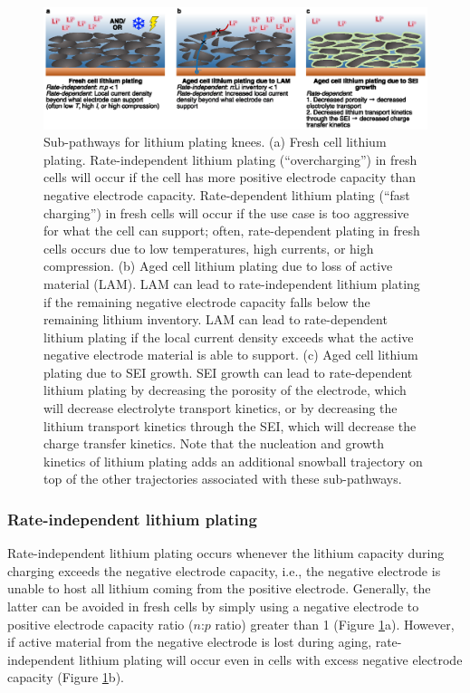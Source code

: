 \documentclass[journal=jpclcd,manuscript=article]{achemso}
\begin{document}
\begin{figure}[tbph]
    \centering
    \includegraphics[scale=0.9]{figures/plating_pathways.eps}
    \caption{Sub-pathways for lithium plating knees.
    (a) Fresh cell lithium plating. Rate-independent lithium plating (``overcharging'') in fresh cells will occur if the cell has more positive electrode capacity than negative electrode capacity.
    Rate-dependent lithium plating (``fast charging'') in fresh cells will occur if the use case is too aggressive for what the cell can support; often, rate-dependent plating in fresh cells occurs due to low temperatures, high currents, or high compression.
    (b) Aged cell lithium plating due to loss of active material (LAM). LAM can lead to rate-independent lithium plating if the remaining negative electrode capacity falls below the remaining lithium inventory. LAM can lead to rate-dependent lithium plating if the local current density exceeds what the active negative electrode material is able to support.
    (c) Aged cell lithium plating due to SEI growth. SEI growth can lead to rate-dependent lithium plating by decreasing the porosity of the electrode, which will decrease electrolyte transport kinetics, or by decreasing the lithium transport kinetics through the SEI, which will decrease the charge transfer kinetics.
    Note that the nucleation and growth kinetics of lithium plating adds an additional snowball trajectory on top of the other trajectories associated with these sub-pathways.}
    \label{fig:plating_pathways}
\end{figure}

\subsubsection{Rate-independent lithium plating}


Rate-independent lithium plating occurs whenever the lithium capacity during charging exceeds the negative electrode capacity, i.e., the negative electrode is unable to host all lithium coming from the positive electrode. Generally, the latter can be avoided in fresh cells by simply using a negative electrode to positive electrode capacity ratio ($n$:$p$ ratio) greater than 1 (Figure \ref{fig:plating_pathways}a). However, if active material from the negative electrode is lost during aging, rate-independent lithium plating will occur even in cells with excess negative electrode capacity (Figure \ref{fig:plating_pathways}b).
\end{document}
